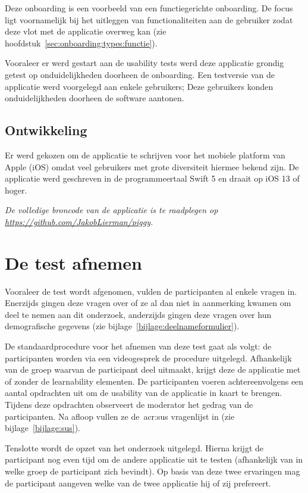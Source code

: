 Deze onboarding is een voorbeeld van een functiegerichte onboarding. De focus ligt voornamelijk bij het uitleggen van functionaliteiten aan de gebruiker zodat deze vlot met de applicatie overweg kan (zie hoofdstuk~\ref{sec:onboarding:types:functie}).

Vooraleer er werd gestart aan de usability tests werd deze applicatie grondig getest op onduidelijkheden doorheen de onboarding. Een testversie van de applicatie werd voorgelegd aan enkele gebruikers; Deze gebruikers konden onduidelijkheden doorheen de software aantonen.

\subsection{Ontwikkeling}
\label{sec:applicatie:ontwikkeling}

Er werd gekozen om de applicatie te schrijven voor het mobiele platform van Apple (iOS) omdat veel gebruikers met grote diversiteit hiermee bekend zijn. De applicatie werd geschreven in de programmeertaal Swift 5 en draait op iOS 13 of hoger.

\textit{De volledige broncode van de applicatie is te raadplegen op \url{https://github.com/JakobLierman/piggy}.}

\section{De test afnemen}
\label{sec:test-afnemen}

Vooraleer de test wordt afgenomen, vulden de participanten al enkele vragen in. Enerzijds gingen deze vragen over of ze al dan niet in aanmerking kwamen om deel te nemen aan dit onderzoek, anderzijds gingen deze vragen over hun demografische gegevens (zie bijlage~\ref{bijlage:deelnameformulier}).

De standaardprocedure voor het afnemen van deze test gaat als volgt: de participanten worden via een videogesprek de procedure uitgelegd. Afhankelijk van de groep waarvan de participant deel uitmaakt, krijgt deze de applicatie met of zonder de learnability elementen. De participanten voeren achtereenvolgens een aantal opdrachten uit om de usability van de applicatie in kaart te brengen. Tijdens deze opdrachten observeert de moderator het gedrag van de participanten. Na afloop vullen ze de~\acrshort{acr:sus} vragenlijst in (zie bijlage~\ref{bijlage:sus}).

Tenslotte wordt de opzet van het onderzoek uitgelegd. Hierna krijgt de participant nog even tijd om de andere applicatie uit te testen (afhankelijk van in welke groep de participant zich bevindt). Op basis van deze twee ervaringen mag de participant aangeven welke van de twee applicatie hij of zij prefereert.
